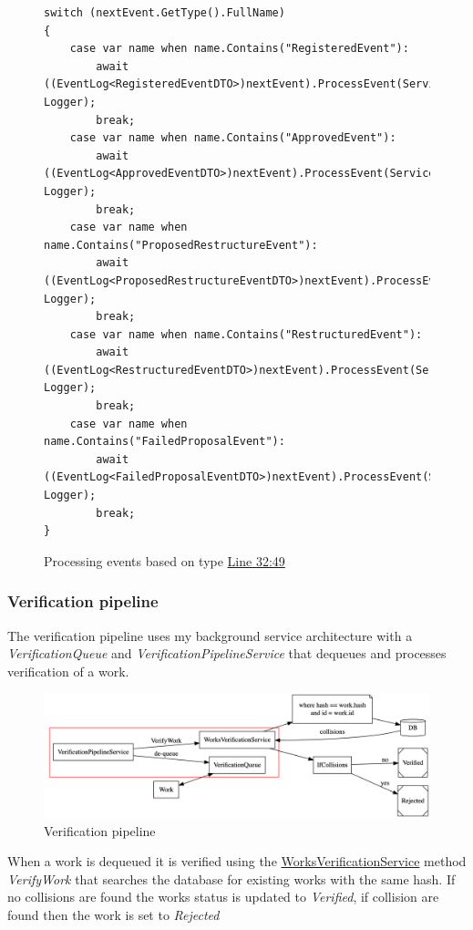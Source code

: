 \begin{figure}[H]
\caption{Processing events based on type \href{https://github.com/MrHarrisonBarker/CRPL/blob/main/CRPL.Web/Services/Background/EventProcessingService.cs}{Line 32:49}}
\centering
\begin{lstlisting}[language=CSharp]
switch (nextEvent.GetType().FullName)
{
	case var name when name.Contains("RegisteredEvent"):
		await ((EventLog<RegisteredEventDTO>)nextEvent).ProcessEvent(ServiceProvider, Logger);
		break;
	case var name when name.Contains("ApprovedEvent"):
		await ((EventLog<ApprovedEventDTO>)nextEvent).ProcessEvent(ServiceProvider, Logger);
		break;
	case var name when name.Contains("ProposedRestructureEvent"):
		await ((EventLog<ProposedRestructureEventDTO>)nextEvent).ProcessEvent(ServiceProvider, Logger);
		break;
	case var name when name.Contains("RestructuredEvent"):
		await ((EventLog<RestructuredEventDTO>)nextEvent).ProcessEvent(ServiceProvider, Logger);
		break;
	case var name when name.Contains("FailedProposalEvent"):
		await ((EventLog<FailedProposalEventDTO>)nextEvent).ProcessEvent(ServiceProvider, Logger);
		break;
}
\end{lstlisting}
\end{figure}

\subsubsection{Verification pipeline}

The verification pipeline uses my background service architecture with a \textit{VerificationQueue} and \textit{VerificationPipelineService} that dequeues and processes verification of a work. 

\begin{figure}[H]
\caption{Verification pipeline}
\centering
\includegraphics[width=\textwidth,height=\textheight,keepaspectratio]{images/operational/verification-pipe}
\end{figure}

When a work is dequeued it is verified using the \href{https://github.com/MrHarrisonBarker/CRPL/blob/main/CRPL.Web/Services/WorksVerificationService.cs}{WorksVerificationService} method \textit{VerifyWork} that searches the database for existing works with the same hash. If no collisions are found the works status is updated to \textit{Verified}, if collision are found then the work is set to \textit{Rejected}

